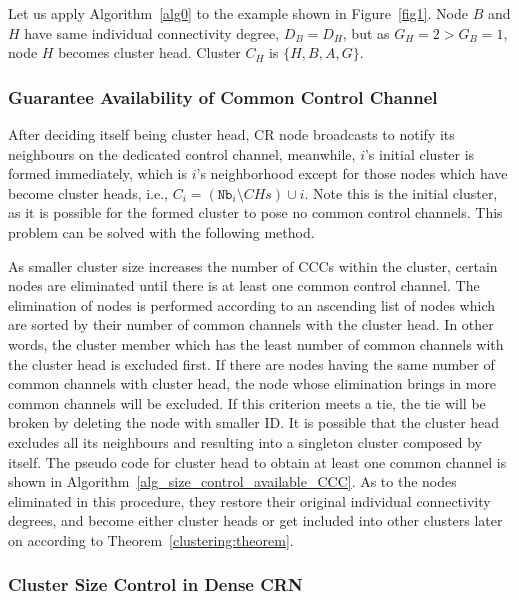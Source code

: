 \documentclass[10pt,journal,compsoc]{IEEEtran}
\theoremstyle{mytheoremstyle}
\theoremstyle{mytheoremstyle}
\theoremstyle{mytheoremstyle}
\newcommand{\ie}{i.e., }
\begin{document}
Let us apply Algorithm~\ref{alg0} to the example shown in Figure~\ref{fig1}.
Node $B$ and $H$ have same individual connectivity degree, $D_B=D_H$, but as $G_H=2>G_B=1$, node $H$ becomes cluster head.
Cluster $C_H$ is $\{H, B, A, G\}$.
	




\subsubsection{Guarantee Availability of Common Control Channel}
After deciding itself being cluster head, CR node broadcasts to notify its neighbours on the dedicated control channel, meanwhile, $i$'s initial cluster is formed immediately, which is $i$'s neighborhood except for those nodes which have become cluster heads, \ie $C_i=(\texttt{Nb}_i\setminus CHs)\cup i$.
Note this is the initial cluster, as it is possible for the formed cluster to pose no common control channels.
This problem can be solved with the following method.

As smaller cluster size increases the number of CCCs within the cluster, certain nodes are eliminated until there is at least one common control channel.
The elimination of nodes is performed according to an ascending list of nodes which are sorted by their number of common channels with the cluster head. 
In other words, the cluster member which has the least number of common channels with the cluster head is excluded first.
If there are nodes having the same number of common channels with cluster head, the node whose elimination brings in more common channels will be excluded.
If this criterion meets a tie, the tie will be broken by deleting the node with smaller ID.
It is possible that the cluster head excludes all its neighbours and resulting into a singleton cluster composed by itself.
The pseudo code for cluster head to obtain at least one common channel is shown in Algorithm~\ref{alg_size_control_available_CCC}.
As to the nodes eliminated in this procedure, they restore their original individual connectivity degrees, and become either cluster heads or get included into other clusters later on according to Theorem~\ref{clustering:theorem}.




\subsubsection{Cluster Size Control in Dense CRN}
\label{cluster_pruning}
\end{document}
